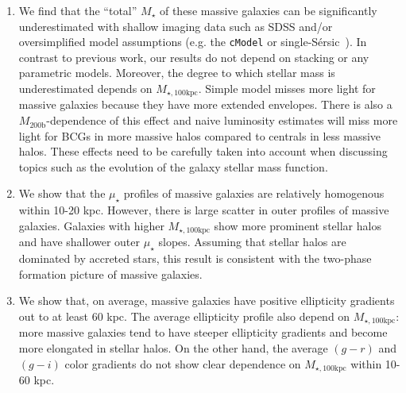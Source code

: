 \documentclass[a4paper,fleqn,usenatbib]{mnras}
\def\ser{{S\'{e}rsic\ }}
\def\mstar{{$M_{\star}$}}
\def\mhalo{{$M_{\mathrm{200b}}$}}
\def\mtot{{$M_{\star,100\mathrm{kpc}}$}}
\def\mden{{$\mu_{\star}$}}
\begin{document}
    \begin{enumerate}
        
        \item We find that the ``total'' \mstar{} of these massive galaxies can be 
            significantly underestimated with shallow imaging data such as SDSS and/or 
            oversimplified model assumptions (e.g. the \texttt{cModel} or single-\ser). 
            In contrast to previous work, our results do not depend on stacking or any 
            parametric models. 
            Moreover, the degree to which stellar mass is underestimated depends on 
            \mtot{}. 
            Simple model misses more light for massive galaxies because they have 
            more extended envelopes. 
            There is also a \mhalo{}-dependence of this effect and naive luminosity
            estimates will miss more light for BCGs in more massive halos compared 
            to centrals in less massive halos.
            These effects need to be carefully taken into account when discussing 
            topics such as the evolution of the galaxy stellar mass function.     
        
        \item We show that the \mden{} profiles of massive galaxies are relatively
            homogenous within 10-20 kpc. 
            However, there is large scatter in outer profiles of massive galaxies. 
            Galaxies with higher \mtot{} show more prominent stellar halos and have 
            shallower outer \mden{} slopes. 
            Assuming that stellar halos are dominated by accreted stars, this result 
            is consistent with the two-phase formation picture of massive galaxies.
             
        \item We show that, on average, massive galaxies have positive ellipticity 
            gradients out to at least 60 kpc. 
            The average ellipticity profile also depend on \mtot{}: more massive 
            galaxies tend to have steeper ellipticity gradients and become more 
            elongated in stellar halos. 
            On the other hand, the average $(g-r)$ and $(g-i)$ color gradients do 
            not show clear dependence on \mtot{} within 10-60 kpc.      
            
    \end{enumerate}
\end{document}
